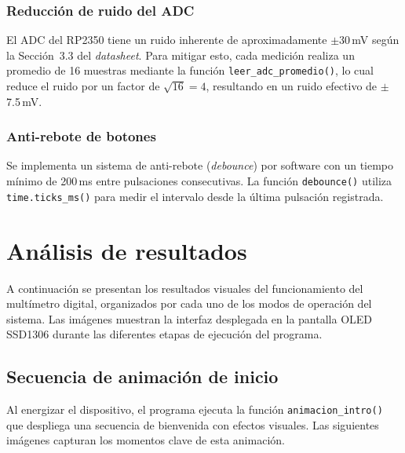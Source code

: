 \documentclass[letterpaper,12pt]{article}
\begin{document}
    \subsubsection{Reducción de ruido del ADC}

    El ADC del RP2350 tiene un ruido inherente de aproximadamente $\pm$30\,mV según la Sección~3.3 del \textit{datasheet}. Para mitigar esto, cada medición realiza un promedio de 16 muestras mediante la función \texttt{leer\_adc\_promedio()}, lo cual reduce el ruido por un factor de $\sqrt{16} = 4$, resultando en un ruido efectivo de $\pm$7.5\,mV.

    \subsubsection{Anti-rebote de botones}

    Se implementa un sistema de anti-rebote (\textit{debounce}) por software con un tiempo mínimo de 200\,ms entre pulsaciones consecutivas. La función \texttt{debounce()} utiliza \texttt{time.ticks\_ms()} para medir el intervalo desde la última pulsación registrada.

    \section{Análisis de resultados}

    A continuación se presentan los resultados visuales del funcionamiento del multímetro digital, organizados por cada uno de los modos de operación del sistema. Las imágenes muestran la interfaz desplegada en la pantalla OLED SSD1306 durante las diferentes etapas de ejecución del programa.

    \subsection{Secuencia de animación de inicio}

    Al energizar el dispositivo, el programa ejecuta la función \texttt{animacion\_intro()} que despliega una secuencia de bienvenida con efectos visuales. Las siguientes imágenes capturan los momentos clave de esta animación.
\end{document}
